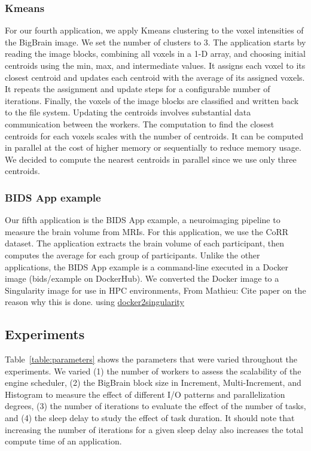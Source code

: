 \documentclass[conference]{IEEEtran}
\newcommand{\MD}[1]{\color{magenta}From Mathieu: #1 \color{black}}
\begin{document}
\subsubsection{Kmeans}
For our fourth application, we apply Kmeans clustering to the voxel
intensities of the BigBrain image. We set the number of clusters to 3. The
application starts by reading the image blocks, combining all voxels in a
1-D array, and choosing initial centroids using the min, max, and
intermediate values. It assigns each voxel to its closest centroid and
updates each centroid with the average of its assigned voxels. It repeats
the assignment and update steps for a configurable number of iterations.
Finally, the voxels of the image blocks are classified and written back to
the file system. Updating the centroids involves substantial data
communication between the workers.
The computation to find the closest centroids for each voxels scales with the number of centroids.
It can be computed in parallel at the cost of higher memory or sequentially to reduce memory usage.
We decided to compute the nearest centroids in parallel since we use only three centroids.

\subsubsection{BIDS App example}
Our fifth application is the BIDS App example, a neuroimaging pipeline to
measure the brain volume from MRIs. For this application, we use the CoRR
dataset. The application extracts the brain volume of each participant,
then computes the average for each group of participants. Unlike the other
applications, the BIDS App example is a command-line executed in a Docker image
(bids/example on DockerHub). We converted the Docker image to a Singularity
image for use in HPC environments, \MD{Cite paper on the reason why this is
done.} using
\href{https://hub.docker.com/r/singularityware/docker2singularity/tags/}{docker2singularity}
		
\subsection{Experiments}
Table~\ref{table:parameters} shows the parameters that were varied
throughout the experiments. We varied (1) the number of workers to assess
the scalability of the engine scheduler, (2) the BigBrain
block size in Increment, Multi-Increment, and Histogram to measure the
effect of different I/O patterns and parallelization degrees, (3) the
number of iterations to evaluate the effect of the number of tasks, and (4) the
sleep delay to study the effect of task duration. It should note that
increasing the number of iterations for a given sleep delay also increases
the total compute time of an application.
		
\end{document}
